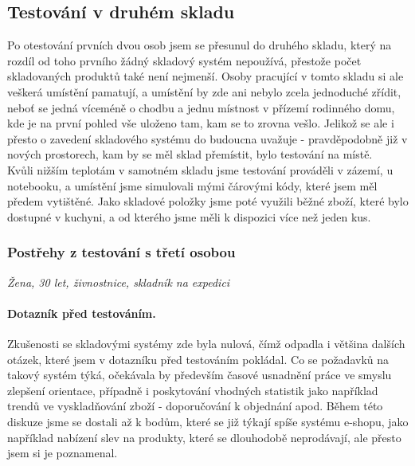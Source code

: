 
\subsection{Testování v druhém skladu}

Po otestování prvních dvou osob jsem se přesunul do druhého skladu, který na rozdíl od toho prvního žádný skladový systém nepoužívá, přestože počet skladovaných produktů také není nejmenší. Osoby pracující v tomto skladu si ale veškerá umístění pamatují, a umístění by zde ani nebylo zcela jednoduché zřídit, neboť se jedná víceméně o chodbu a jednu místnost v přízemí rodinného domu, kde je na první pohled vše uloženo tam, kam se to zrovna vešlo. Jelikož se ale i přesto o zavedení skladového systému do budoucna uvažuje - pravděpodobně již v nových prostorech, kam by se měl sklad přemístit, bylo testování na místě.\\
Kvůli nižším teplotám v samotném skladu jsme testování prováděli v zázemí, u notebooku, a umístění jsme simulovali mými čárovými kódy, které jsem měl předem vytištěné. Jako skladové položky jsme poté využili běžné zboží, které bylo dostupné v kuchyni, a od kterého jsme měli k dispozici více než jeden kus.


\subsubsection{Postřehy z testování s třetí osobou}
\emph{Žena, 30 let, živnostnice, skladník na expedici}

\paragraph{Dotazník před testováním.} Zkušenosti se skladovými systémy zde byla nulová, čímž odpadla i většina dalších otázek, které jsem v dotazníku před testováním pokládal. Co se požadavků na takový systém týká, očekávala by především časové usnadnění práce ve smyslu zlepšení orientace, případně i poskytování vhodných statistik jako například trendů ve vyskladňování zboží - doporučování k objednání apod. Během této diskuze jsme se dostali až k bodům, které se již týkají spíše systému e-shopu, jako například nabízení slev na produkty, které se dlouhodobě neprodávají, ale přesto jsem si je poznamenal.

